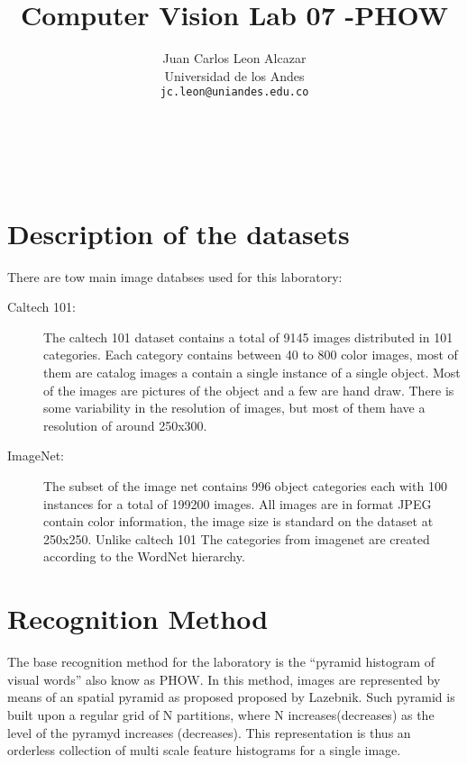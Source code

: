 \documentclass[10pt,twocolumn,letterpaper]{article}
\begin{document}
\title{Computer Vision Lab 07 -PHOW }

\author{Juan Carlos Leon Alcazar\\
Universidad de los Andes\\
{\tt\small jc.leon@uniandes.edu.co}
\and
\\
\\
\\
{\tt\small }
}

\maketitle


\section{Description of the datasets}
There are tow main image databses used for this laboratory:

\begin{description}
\item[Caltech 101:] The caltech 101 dataset contains a total of 9145 images distributed in 101 categories. Each category contains between 40 to 800 color images, most of them are catalog images a contain a single instance of a single object. Most of the images are pictures of the object and a few are hand draw.  There is some variability in the resolution of images, but most of them have a resolution of around 250x300.

\item[ImageNet:] The subset of the image net contains 996 object categories each with 100 instances for a total of 199200 images. All images are in format JPEG contain color information, the image size is standard on the dataset at 250x250. Unlike caltech 101 The categories from imagenet are created according to the  WordNet hierarchy.
\end{description} 


\section{Recognition Method}

The base recognition method for the laboratory is the “pyramid histogram of visual words” also know as PHOW. In this method, images are represented by means of an spatial pyramid as proposed proposed by Lazebnik. Such pyramid  is built upon a regular grid of  N  partitions, where N increases(decreases) as the level of the pyramyd increases (decreases). This representation is thus an orderless collection of multi scale feature histograms for a single image.
\end{document}
